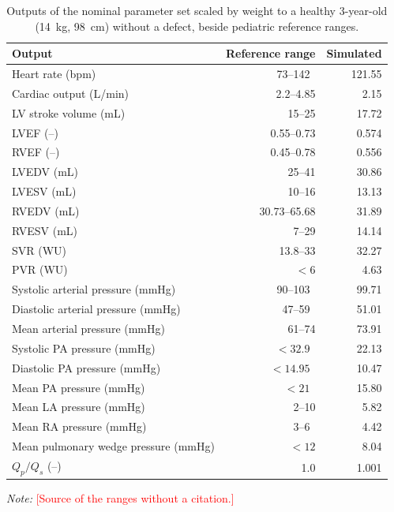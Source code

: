 \documentclass{article}
\providecommand{\pending}[1]{\textcolor{red}{[#1]}}
\begin{document}
\begin{table}[H]
\centering\small
\caption{Outputs of the nominal parameter set scaled by weight to a healthy 3-year-old (14~kg, 98~cm) without a defect, beside pediatric reference ranges.}
\label{tab:S-healthy}
\begin{tabular}{lrr}
\toprule
\textbf{Output} & \textbf{Reference range} & \textbf{Simulated} \\
\midrule
Heart rate (bpm) & 73--142~\cite{Joyce2025} & 121.55 \\
Cardiac output (L/min) & 2.2--4.85 & 2.15 \\
LV stroke volume (mL) & 15--25 & 17.72 \\
LVEF (--) & 0.55--0.73 & 0.574 \\
RVEF (--) & 0.45--0.78 & 0.556 \\
LVEDV (mL) & 25--41 & 30.86 \\
LVESV (mL) & 10--16 & 13.13 \\
RVEDV (mL) & 30.73--65.68 & 31.89 \\
RVESV (mL) & 7--29 & 14.14 \\
SVR (WU) & 13.8--33 & 32.27 \\
PVR (WU) & $<6$ & 4.63 \\
Systolic arterial pressure (mmHg) & 90--103~\cite{Flynn2017} & 99.71 \\
Diastolic arterial pressure (mmHg) & 47--59~\cite{Flynn2017} & 51.01 \\
Mean arterial pressure (mmHg) & 61--74 & 73.91 \\
Systolic PA pressure (mmHg) & $<32.9$~\cite{MalakanRad2024} & 22.13 \\
Diastolic PA pressure (mmHg) & $<14.95$~\cite{MalakanRad2024} & 10.47 \\
Mean PA pressure (mmHg) & $<21$~\cite{MalakanRad2024} & 15.80 \\
Mean LA pressure (mmHg) & 2--10 & 5.82 \\
Mean RA pressure (mmHg) & 3--6~\cite{MalakanRad2024} & 4.42 \\
Mean pulmonary wedge pressure (mmHg) & $<12$ & 8.04 \\
$Q_p/Q_s$ (--) & 1.0 & 1.001 \\
\bottomrule
\end{tabular}
\par\vspace{2pt}
{\footnotesize \emph{Note:} \pending{Source of the ranges without a citation.}}
\end{table}
\end{document}

